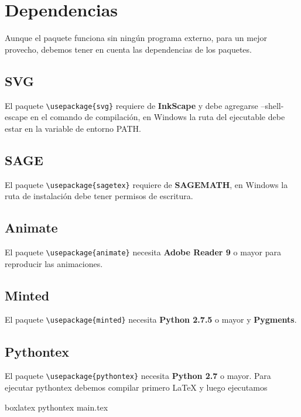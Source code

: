 \chapter{Dependencias}\label{cap:dependencias}
{\justifying
	Aunque el paquete \printproject\space funciona sin ningún programa externo, para un mejor provecho, debemos tener en cuenta las dependencias de los paquetes.
	\section{SVG}\label{sec:DependenciasSVG}
	El paquete \verb|\usepackage{svg}| requiere de \textbf{InkScape} y debe agregarse --shell-escape en el comando de compilación, en Windows la ruta del ejecutable debe estar en la variable de entorno PATH. 
	\section{SAGE}
	El paquete \verb|\usepackage{sagetex}| requiere de \textbf{SAGEMATH}, en Windows la ruta de instalación debe tener permisos de escritura.
	\section{Animate}
	El paquete \verb|\usepackage{animate}| necesita \textbf{Adobe Reader 9} o mayor para reproducir las animaciones.
	\section{Minted}
	El paquete \verb|\usepackage{minted}| necesita \textbf{Python 2.7.5} o mayor y \textbf{Pygments}.
	\section{Pythontex}
	El paquete \verb|\usepackage{pythontex}| necesita \textbf{Python 2.7} o mayor. Para ejecutar pythontex debemos compilar primero {\LaTeX} y luego ejecutamos 
	\begin{tcblisting}{boxlatex}	
		pythontex main.tex 
	\end{tcblisting}
}